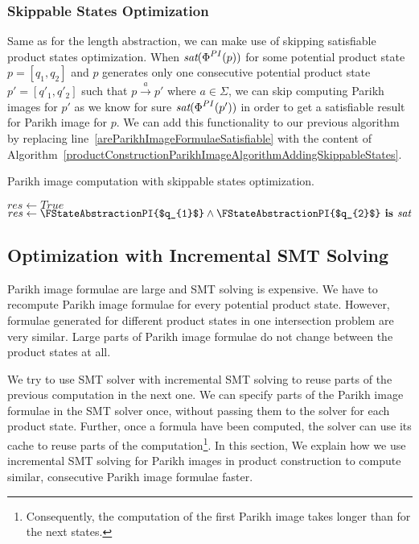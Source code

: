 \subsubsection{Skippable States Optimization}

Same as for the length abstraction, we can make use of skipping satisfiable product states optimization. When $\emph{sat}(\emph{$\Phi$}^{PI}(p))$ for some potential product state $p = [q_1, q_2]$ and $p$ generates only one consecutive potential product state $p' = [q'_1, q'_2]$ such that $p \xrightarrow{a} p'$ where $ a \in \Sigma $, we can skip computing Parikh images for $p'$ as we know for sure $\emph{sat}(\emph{$\Phi$}^{PI}(p'))$ in order to get a satisfiable result for Parikh image for $p$. We can add this functionality to our previous algorithm by replacing line~\ref{areParikhImageFormulaeSatisfiable} with the content of Algorithm~\ref{productConstructionParikhImageAlgorithmAddingSkippableStates}.

\begin{algorithm}
\caption{Parikh image computation with skippable states optimization.}\label{productConstructionParikhImageAlgorithmAddingSkippableStates}
\DontPrintSemicolon
\BlankLine
    \eIf{$\FIsSkippable{$[q_1, q_2]$}$} {
        $res \gets True$ \;
    } { %
        $res \gets \FStateAbstractionPI{$q_{1}$} \land \FStateAbstractionPI{$q_{2}$} \textbf{ is } \emph{sat} $ \;
    }
\end{algorithm}

\subsection{Optimization with Incremental SMT Solving}

Parikh image formulae are large and SMT solving is expensive. We have to recompute Parikh image formulae for every potential product state. However, formulae generated for different product states in one intersection problem are very similar. Large parts of Parikh image formulae do not change between the product states at all.

We try to use SMT solver with incremental SMT solving to reuse parts of the previous computation in the next one. We can specify parts of the Parikh image formulae in the SMT solver once, without passing them to the solver for each product state. Further, once a formula have been computed, the solver can use its cache to reuse parts of the computation\footnote{Consequently, the computation of the first Parikh image takes longer than for the next states.}. In this section, We explain how we use incremental SMT solving for Parikh images in product construction to compute similar, consecutive Parikh image formulae faster.

